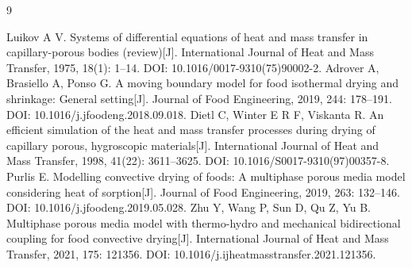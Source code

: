 \begin{thebibliography}{9}
\raggedright
{} Luikov A V. Systems of differential equations of heat and mass transfer in capillary-porous bodies (review)[J]. International Journal of Heat and Mass Transfer, 1975, 18(1): 1--14. DOI: 10.1016/0017-9310(75)90002-2.
 Adrover A, Brasiello A, Ponso G. A moving boundary model for food isothermal drying and shrinkage: General setting[J]. Journal of Food Engineering, 2019, 244: 178--191. DOI: 10.1016/j.jfoodeng.2018.09.018.
 Dietl C, Winter E R F, Viskanta R. An efficient simulation of the heat and mass transfer processes during drying of capillary porous, hygroscopic materials[J]. International Journal of Heat and Mass Transfer, 1998, 41(22): 3611--3625. DOI: 10.1016/S0017-9310(97)00357-8.
 Purlis E. Modelling convective drying of foods: A multiphase porous media model considering heat of sorption[J]. Journal of Food Engineering, 2019, 263: 132--146. DOI: 10.1016/j.jfoodeng.2019.05.028.
 Zhu Y, Wang P, Sun D, Qu Z, Yu B. Multiphase porous media model with thermo-hydro and mechanical bidirectional coupling for food convective drying[J]. International Journal of Heat and Mass Transfer, 2021, 175: 121356. DOI: 10.1016/j.ijheatmasstransfer.2021.121356.
\end{thebibliography}

